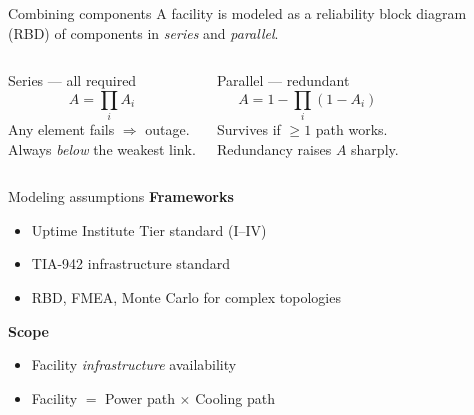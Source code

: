 \begin{frame}{Combining components}
  A facility is modeled as a reliability block diagram (RBD) of components in
  \emph{series} and \emph{parallel}.

  \vspace{0.4em}
  \begin{columns}[T]
      \begin{block}{Series --- all required}
        \[ A = \prod_i A_i \]
        Any element fails $\Rightarrow$ outage.\\
        Always \emph{below} the weakest link.
      \end{block}
      \begin{block}{Parallel --- redundant}
        \[ A = 1 - \prod_i (1-A_i) \]
        Survives if $\geq 1$ path works.\\
        Redundancy raises $A$ sharply.
      \end{block}
  \end{columns}

\end{frame}


\begin{frame}{Modeling assumptions}
  \textbf{Frameworks}
    \begin{itemize}
      \item Uptime Institute Tier standard (I--IV)
      \item TIA-942 infrastructure standard
      \item RBD, FMEA, Monte Carlo for complex topologies
    \end{itemize}
  \vspace{1em}
  \textbf{Scope}
    \begin{itemize}
      \item Facility \emph{infrastructure} availability
      \item Facility $=$ Power path $\times$ Cooling path
    \end{itemize}
\end{frame}


